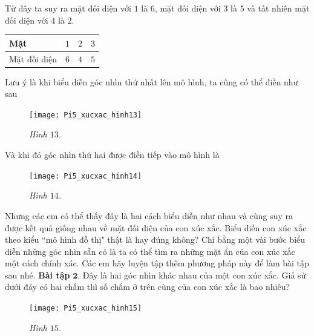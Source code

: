 \begin{multicols}{2}
\begin{figure}[H]
	\end{figure}
	Từ đây ta suy ra mặt đối diện với $1$ là $6$, mặt đối diện với $3$ là $5$ và tất nhiên mặt đối diện với $4$ là $2$.
	\vskip 0.1cm
	\begin{table}[H]
		\vspace*{-5pt}
		\centering
		\setlength{\tabcolsep}{10pt}
		\renewcommand{\arraystretch}{1.2}
		\begin{tabular}{|l|c|c|c|}
			\hline
			Mặt& 	$1$&	$2$&	$3$\\
			\hline
			Mặt đối diện&	$6$&	$4$&	$5$\\
			\hline
		\end{tabular}
		\vspace*{-5pt}
	\end{table}
	Lưu ý là khi biểu diễn góc nhìn thứ nhất lên mô hình, ta cũng có thể điền như sau
	\begin{figure}[H]
		\vspace*{-5pt}
		\centering
		\captionsetup{labelformat= empty, justification=centering}
		\texttt{[image: Pi5\_xucxac\_hinh13]}
		\caption{\small\textit{\color{toancuabi}Hình $13$.}}
		\vspace*{-5pt}
	\end{figure}
	Và khi đó góc nhìn thứ hai được điền tiếp vào mô hình là
	\begin{figure}[H]
		\vspace*{-5pt}
		\centering
		\captionsetup{labelformat= empty, justification=centering}
		\texttt{[image: Pi5\_xucxac\_hinh14]}
		\caption{\small\textit{\color{toancuabi}Hình $14$.}}
		\vspace*{-10pt}
	\end{figure}
	Nhưng các em có thể thấy đây là hai cách biểu diễn như nhau và cùng suy ra được kết quả giống nhau về mặt đối diện của con xúc xắc.
	\vskip 0.1cm
	Biểu diễn con xúc xắc theo kiểu ``mô hình đồ thị" thật là hay đúng không? Chỉ bằng một vài bước biểu diễn những góc nhìn sẵn có là ta có thể tìm ra những mặt ẩn của con xúc xắc một cách chính xác. Các em hãy luyện tập thêm phương pháp này để làm bài tập sau nhé.
	\vskip 0.1cm
	\textbf{\color{toancuabi}Bài tập} $\pmb{2.}$ Đây là hai góc nhìn khác nhau của một con xúc xắc. Giả sử dưới đáy có hai chấm thì số chấm ở trên cùng của con xúc xắc là bao nhiêu?
	\begin{figure}[H]
		\vspace*{-5pt}
		\centering
		\captionsetup{labelformat= empty, justification=centering}
		\texttt{[image: Pi5\_xucxac\_hinh15]}
		\caption{\small\textit{\color{toancuabi}Hình $15$.}}

\end{figure}
\end{multicols}
